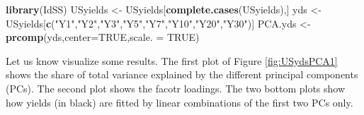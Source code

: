 \documentclass[
  12pt,
]{book}
\newenvironment{Shaded}{\begin{snugshade}}{\end{snugshade}}
\newcommand{\AttributeTok}[1]{\textcolor[rgb]{0.13,0.29,0.53}{#1}}
\newcommand{\ConstantTok}[1]{\textcolor[rgb]{0.56,0.35,0.01}{#1}}
\newcommand{\FunctionTok}[1]{\textcolor[rgb]{0.13,0.29,0.53}{\textbf{#1}}}
\newcommand{\NormalTok}[1]{#1}
\newcommand{\OtherTok}[1]{\textcolor[rgb]{0.56,0.35,0.01}{#1}}
\newcommand{\StringTok}[1]{\textcolor[rgb]{0.31,0.60,0.02}{#1}}
\theoremstyle{definition}
\theoremstyle{definition}
\theoremstyle{definition}
\theoremstyle{definition}
\theoremstyle{remark}
\begin{document}
\begin{Shaded}
\begin{Highlighting}[]
\FunctionTok{library}\NormalTok{(IdSS)}
\NormalTok{USyields }\OtherTok{\textless{}{-}}\NormalTok{ USyields[}\FunctionTok{complete.cases}\NormalTok{(USyields),]}
\NormalTok{yds }\OtherTok{\textless{}{-}}\NormalTok{ USyields[}\FunctionTok{c}\NormalTok{(}\StringTok{"Y1"}\NormalTok{,}\StringTok{"Y2"}\NormalTok{,}\StringTok{"Y3"}\NormalTok{,}\StringTok{"Y5"}\NormalTok{,}\StringTok{"Y7"}\NormalTok{,}\StringTok{"Y10"}\NormalTok{,}\StringTok{"Y20"}\NormalTok{,}\StringTok{"Y30"}\NormalTok{)]}
\NormalTok{PCA.yds }\OtherTok{\textless{}{-}} \FunctionTok{prcomp}\NormalTok{(yds,}\AttributeTok{center=}\ConstantTok{TRUE}\NormalTok{,}\AttributeTok{scale. =} \ConstantTok{TRUE}\NormalTok{)}
\end{Highlighting}
\end{Shaded}

Let us know visualize some results. The first plot of Figure \ref{fig:USydsPCA1} shows the share of total variance explained by the different principal components (PCs). The second plot shows the facotr loadings. The two bottom plots show how yields (in black) are fitted by linear combinations of the first two PCs only.
\end{document}

